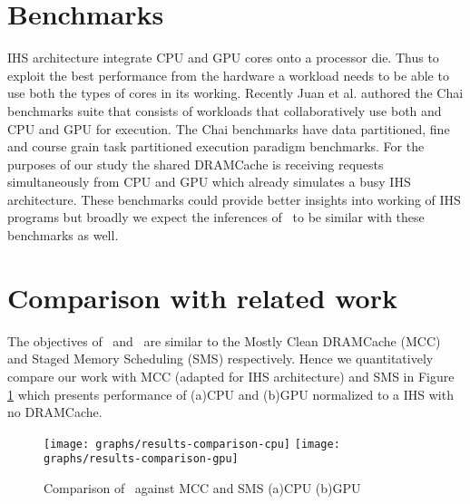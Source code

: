 \section{Benchmarks}
IHS architecture integrate CPU and GPU cores onto a processor die. Thus to exploit the best performance from the hardware a workload needs to be able to use both the types of cores in its working. Recently Juan et al. authored the Chai benchmarks suite \cite{chai} that consists of workloads that collaboratively use both and CPU and GPU for execution. The Chai benchmarks have data partitioned, fine and course grain task partitioned execution paradigm benchmarks. For the purposes of our study the shared DRAMCache is receiving requests simultaneously from CPU and GPU which already simulates a busy IHS architecture. These benchmarks could provide better insights into working of IHS programs but broadly we expect the inferences of \cachename\ to be similar with these benchmarks as well.

\section{Comparison with related work} \label{comparison}
The objectives of \bypassname\ and \prioname\ are similar to the Mostly Clean DRAMCache (MCC) \cite{mostly-clean} and Staged Memory Scheduling (SMS) \cite{sms} respectively. Hence we quantitatively 	compare our work with MCC (adapted for IHS architecture) and SMS in Figure \ref{results-comparison} which presents performance of (a)CPU and (b)GPU normalized to a IHS with no DRAMCache. 

\begin{figure}[!htb]
	\centering
	\texttt{[image: graphs/results-comparison-cpu]}
	\texttt{[image: graphs/results-comparison-gpu]}
	\caption{Comparison of \cachename\ against MCC \cite{mostly-clean} and SMS \cite{sms} (a)CPU (b)GPU}
	\label{results-comparison}
\end{figure}

